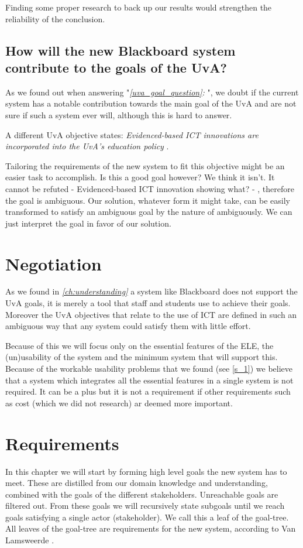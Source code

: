 Finding some proper research to back up our results would strengthen the reliability of the conclusion.


\section{How will the new Blackboard system contribute to the goals of the UvA?}
As we found out when answering "\emph{\ref{uva_goal_question}: }", we doubt if the current system has a notable contribution towards the main goal of the UvA and are not sure if such a system ever will, although this is hard to answer.

A different UvA objective states: \emph{Evidenced-based ICT innovations are	incorporated into the UvA’s education policy} \cite{uva_strategic_plan}.

Tailoring the requirements of the new system to fit this objective might be an easier task to accomplish. Is this a good goal however? We think it isn't. It cannot be refuted - Evidenced-based ICT innovation showing what? - , therefore the goal is ambiguous. Our solution, whatever form it might take, can be easily transformed to satisfy an ambiguous goal by the nature of ambiguously. We can just interpret the goal in favor of our solution. 




\chapter{Negotiation}
As we found in \emph{\ref{ch:understanding} } a system like Blackboard does not support the UvA goals, it is merely a tool that staff and students use to achieve their goals. Moreover the UvA objectives that relate to the use of ICT are defined in such an ambiguous way that any system could satisfy them with little effort.

Because of this we will focus only on the essential features of the ELE, the (un)usability of the system and the minimum system that will support this. Because of the workable usability problems that we found (see \ref{s_1}) we believe that a system which integrates all the essential features in a single system is not required. It can be a plus but it is not a requirement if other requirements such as cost (which we did not research) ar deemed more important.


\chapter{Requirements}
In this chapter we will start by forming high level goals the new system has to meet. These are distilled from our domain knowledge and understanding, combined with the goals of the different stakeholders. Unreachable goals are filtered out. From these goals we will recursively state subgoals until we reach goals satisfying a single actor (stakeholder). We call this a leaf of the goal-tree. All leaves of the goal-tree are requirements for the new system, according to Van Lamsweerde \cite{RE_book}.

